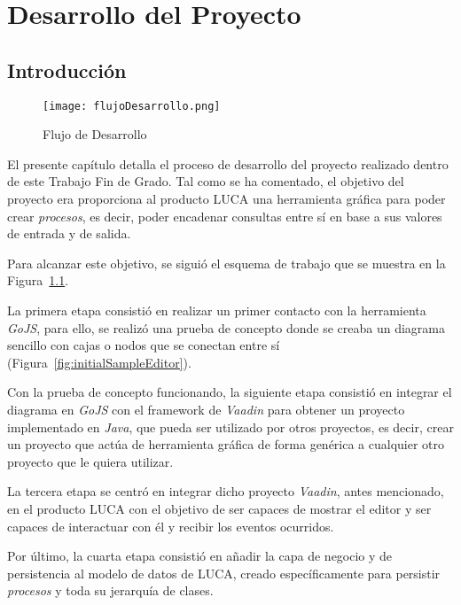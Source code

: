 \chapter{Desarrollo del Proyecto}

\minitoc

\section{Introducción}

\begin{figure}[!tb]
	\centering
	\texttt{[image: flujoDesarrollo.png]}
	\caption{Flujo de Desarrollo}
	\label{fig:flujoDesarrollo}
\end{figure}


El presente capítulo detalla el proceso de desarrollo del proyecto realizado dentro de este Trabajo Fin de Grado. Tal como se ha comentado, el objetivo del proyecto era 
proporciona al producto LUCA una herramienta gráfica para poder crear \emph{procesos}, es decir, poder encadenar consultas entre sí en base a sus valores de entrada y de salida.

Para alcanzar este objetivo, se siguió el esquema de trabajo que se muestra en la Figura~\ref{fig:flujoDesarrollo}.  

La primera etapa consistió en realizar un primer contacto con la herramienta \emph{GoJS}, para ello, se realizó una prueba de concepto donde se creaba un diagrama sencillo con cajas o nodos que se conectan entre sí (Figura~\ref{fig:initialSampleEditor}).

Con la prueba de concepto funcionando, la siguiente etapa consistió en integrar el diagrama en \emph{GoJS} con el framework de \emph{Vaadin} para obtener un proyecto implementado en \emph{Java}, que pueda ser utilizado por otros proyectos, es decir, crear un proyecto que actúa de herramienta gráfica de forma genérica a cualquier otro proyecto que le quiera utilizar.

La tercera etapa se centró en integrar dicho proyecto \emph{Vaadin}, antes mencionado, en el producto LUCA con el objetivo de ser capaces de mostrar el editor y ser capaces de interactuar con él y recibir los eventos ocurridos.

Por último, la cuarta etapa consistió en añadir la capa de negocio y de persistencia al modelo de datos de LUCA, creado específicamente para persistir \emph{procesos} y toda su jerarquía de clases.

